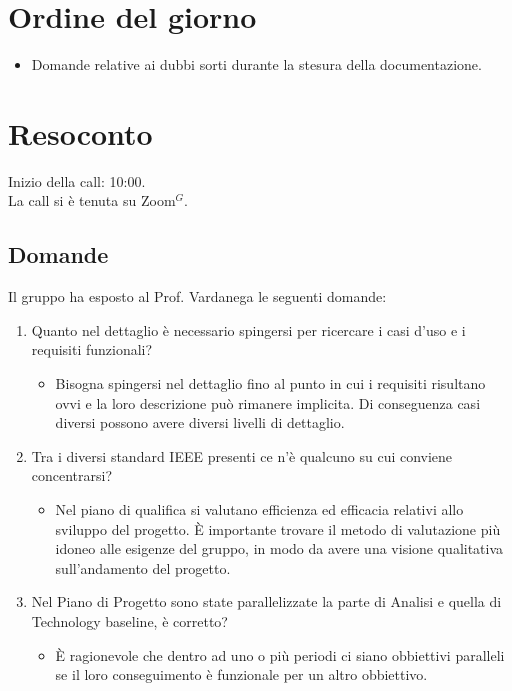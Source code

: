 \section{Ordine del giorno}

\begin{itemize}
	\item Domande relative ai dubbi sorti durante la stesura della documentazione.
\end{itemize}

\section{Resoconto}
\label{sec:Resoconto}

\noindent 
Inizio della call: 10:00. \\
\noindent La call si è tenuta su Zoom$^{G}$.

\subsection{Domande}
Il gruppo ha esposto al Prof. Vardanega le seguenti domande:

\begin{enumerate}
	\item Quanto nel dettaglio è necessario spingersi per ricercare i casi d'uso e i requisiti funzionali?
	\begin{itemize}
		\item Bisogna spingersi nel dettaglio fino al punto in cui i requisiti risultano ovvi e la loro descrizione può rimanere implicita.
			  Di conseguenza casi diversi possono avere diversi livelli di dettaglio.
	\end{itemize}
	\item Tra i diversi standard IEEE presenti ce n'è qualcuno su cui conviene concentrarsi?
	\begin{itemize}
		\item Nel piano di qualifica si valutano efficienza ed efficacia relativi allo sviluppo del progetto. 
		È importante trovare il metodo di valutazione più idoneo alle esigenze del gruppo, in modo da avere una visione qualitativa sull'andamento del progetto.
	\end{itemize}
	\item Nel Piano di Progetto sono state parallelizzate la parte di Analisi e quella di Technology baseline, è corretto?
	\begin{itemize}
		\item È ragionevole che dentro ad uno o più periodi ci siano obbiettivi paralleli se il loro conseguimento è funzionale per un altro obbiettivo.
	\end{itemize}

	
\end{enumerate}


